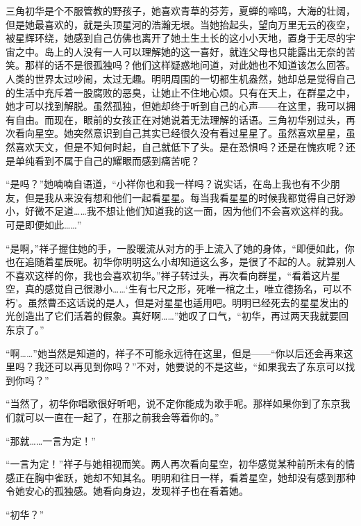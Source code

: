 \documentclass{article}
\begin{document}
三角初华是个不服管教的野孩子，她喜欢青草的芬芳，夏蝉的啼鸣，大海的壮阔，但是她最喜欢的，就是头顶星河的浩瀚无垠。当她抬起头，望向万里无云的夜空，被星辉环绕，她感到自己仿佛也离开了她土生土长的这小小天地，置身于无尽的宇宙之中。岛上的人没有一人可以理解她的这一喜好，就连父母也只能露出无奈的苦笑。那样的话不是很孤独吗？他们这样疑惑地问道，对此她也不知道该怎么回答。人类的世界太过吵闹，太过无趣。明明周围的一切都生机盎然，她却总是觉得自己的生活中充斥着一股腐败的恶臭，让她止不住地心烦。只有在天上，在群星之中，她才可以找到解脱。虽然孤独，但她却终于听到自己的心声——在这里，我可以拥有自由。而现在，眼前的女孩正在对她说着无法理解的话语。三角初华别过头，再次看向星空。她突然意识到自己其实已经很久没有看过星星了。虽然喜欢星星，虽然喜欢天文，但是不知何时起，自己就低下了头。是在恐惧吗？还是在愧疚呢？还是单纯看到不属于自己的耀眼而感到痛苦呢？



“是吗？”她喃喃自语道，“小祥你也和我一样吗？说实话，在岛上我也有不少朋友，但是我从来没有想和他们一起看星星。每当我看星星的时候我都觉得自己好渺小，好微不足道……我不想让他们知道我的这一面，因为他们不会喜欢这样的我。可是即便如此……”



“是啊，”祥子握住她的手，一股暖流从对方的手上流入了她的身体，“即便如此，你也在追随着星辰呢。初华你明明这么小却知道这么多，是很了不起的人。就算别人不喜欢这样的你，我也会喜欢初华。”祥子转过头，再次看向群星，“看着这片星空，真的感觉自己很渺小……‘生有七尺之形，死唯一棺之土，唯立德扬名，可以不朽’。虽然曹丕这话说的是人，但是对星星也适用吧。明明已经死去的星星发出的光创造出了它们活着的假象。真好啊……”她叹了口气，“初华，再过两天我就要回东京了。”



“啊……”她当然是知道的，祥子不可能永远待在这里，但是——“你以后还会再来这里吗？我还可以再见到你吗？”不对，她要说的不是这些，“如果我去了东京可以找到你吗？”



“当然了，初华你唱歌很好听吧，说不定你能成为歌手呢。那样如果你到了东京我们就可以一直在一起了，在那之前我会等着你的。”



“那就……一言为定！”



“一言为定！”祥子与她相视而笑。两人再次看向星空，初华感觉某种前所未有的情感正在胸中雀跃，她却不知其名。明明和往日一样，看着星空，她却没有感到那种令她安心的孤独感。她看向身边，发现祥子也在看着她。



“初华？”
\end{document}
